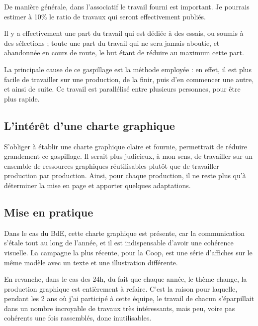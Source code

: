 
    De manière générale, dans l'associatif le travail fourni est important. Je pourrais estimer à 10\% le ratio de travaux qui seront effectivement publiés.

    Il y a effectivement une part du travail qui est dédiée à des essais, ou soumis à des sélections ; toute une part du travail qui ne sera jamais aboutie, et abandonnée en cours de route, le but étant de réduire au maximum cette part.

    La principale cause de ce gaspillage est la méthode employée : en effet, il est plus facile de travailler sur une production, de la finir, puis d'en commencer une autre, et ainsi de suite. Ce travail est parallélisé entre plusieurs personnes, pour être plus rapide.

    \subsection{L'intérêt d'une charte graphique}
    
        S'obliger à établir une charte graphique claire et fournie, permettrait de réduire grandement ce gaspillage.
        Il serait plus judicieux, à mon sens, de travailler sur un ensemble de ressources graphiques réutilisables plutôt que de travailler production par production.
        Ainsi, pour chaque production, il ne reste plus qu'à déterminer la mise en page et  apporter quelques adaptations.

    \subsection{Mise en pratique}

        Dans le cas du BdE, cette charte graphique est présente, car la communication s'étale tout au long de l'année, et il est indispensable d'avoir une cohérence visuelle.
        La campagne la plus récente, pour la Coop, est une série d'affiches sur le même modèle avec un texte et une illustration différente.
        
        En revanche, dans le cas des 24h, du fait que chaque année, le thème change, la production graphique est entièrement à refaire.
        C'est la raison pour laquelle, pendant les 2 ans où j'ai participé à cette équipe, le travail de chacun s'éparpillait dans un nombre incroyable de travaux très intéressants, mais peu, voire pas cohérents une fois rassemblés, donc inutilisables.
        
